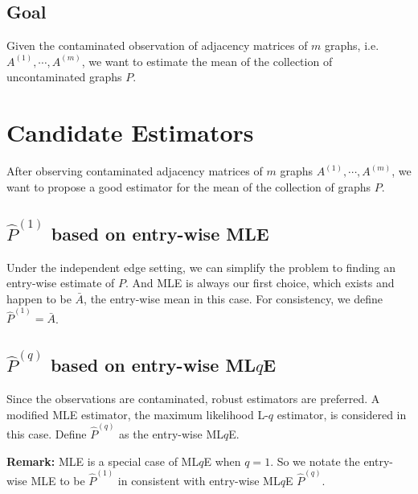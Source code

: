 \documentclass[a4paper]{article}
\begin{document}


\subsection{Goal}
Given the contaminated observation of adjacency matrices of $m$ graphs, i.e. $A^{(1)}, \cdots, A^{(m)}$, we want to estimate the mean of the collection of uncontaminated graphs $P$.










\section{Candidate Estimators}

After observing contaminated adjacency matrices of $m$ graphs $A^{(1)}, \cdots, A^{(m)}$, we want to propose a good estimator for the mean of the collection of graphs $P$.

\subsection{$\hat{P}^{(1)}$ based on entry-wise MLE}
Under the independent edge setting, we can simplify the problem to finding an entry-wise estimate of $P$. And MLE is always our first choice, which exists and happen to be $\bar{A}$, the entry-wise mean in this case. For consistency, we define $\hat{P}^{(1)} = \bar{A}$.


\subsection{$\hat{P}^{(q)}$ based on entry-wise ML$q$E}
Since the observations are contaminated, robust estimators are preferred. A modified MLE estimator, the maximum likelihood L-$q$ estimator, is considered in this case. Define $\hat{P}^{(q)}$ as the entry-wise ML$q$E.

\noindent \textbf{Remark:} MLE is a special case of ML$q$E when $q = 1$. So we notate the entry-wise MLE to be $\hat{P}^{(1)}$ in consistent with entry-wise ML$q$E $\hat{P}^{(q)}$.
\end{document}
